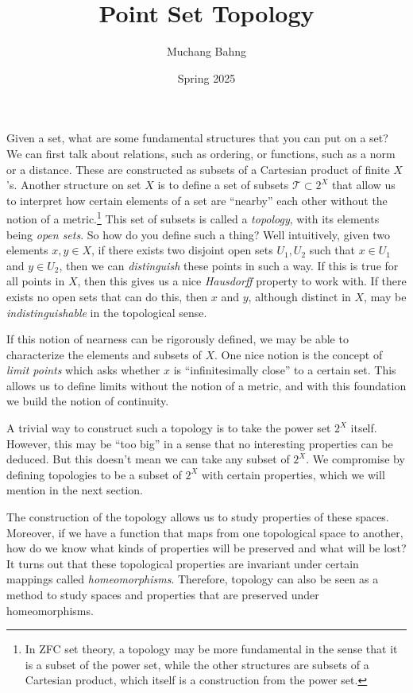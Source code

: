 \documentclass{article}
\begin{document}
\title{Point Set Topology}
\author{Muchang Bahng}
\date{Spring 2025}

\maketitle
\tableofcontents
\pagebreak

  Given a set, what are some fundamental structures that you can put on a set? We can first talk about relations, such as ordering, or functions, such as a norm or a distance. These are constructed as subsets of a Cartesian product of finite $X$'s. Another structure on set $X$ is to define a set of subsets $\mathscr{T} \subset 2^X$ that allow us to interpret how certain elements of a set are ``nearby'' each other without the notion of a metric.\footnote{In ZFC set theory, a topology may be more fundamental in the sense that it is a subset of the power set, while the other structures are subsets of a Cartesian product, which itself is a construction from the power set.} This set of subsets is called a \textit{topology}, with its elements being \textit{open sets}. So how do you define such a thing? Well intuitively, given two elements $x, y \in X$, if there exists two disjoint open sets $U_1, U_2$ such that $x \in U_1$ and $y \in U_2$, then we can \textit{distinguish} these points in such a way. If this is true for all points in $X$, then this gives us a nice \textit{Hausdorff} property to work with. If there exists no open sets that can do this, then $x$ and $y$, although distinct in $X$, may be \textit{indistinguishable} in the topological sense. 
  
  If this notion of nearness can be rigorously defined, we may be able to characterize the elements and subsets of $X$. One nice notion is the concept of \textit{limit points} which asks whether $x$ is ``infinitesimally close'' to a certain set. This allows us to define limits without the notion of a metric, and with this foundation we build the notion of continuity.    

  A trivial way to construct such a topology is to take the power set $2^X$ itself. However, this may be ``too big'' in a sense that no interesting properties can be deduced. But this doesn't mean we can take any subset of $2^X$. We compromise by defining topologies to be a subset of $2^X$ with certain properties, which we will mention in the next section. 

  The construction of the topology allows us to study properties of these spaces. Moreover, if we have a function that maps from one topological space to another, how do we know what kinds of properties will be preserved and what will be lost? It turns out that these topological properties are invariant under certain mappings called \textit{homeomorphisms}. Therefore, topology can also be seen as a method to study spaces and properties that are preserved under homeomorphisms. 
\end{document}
